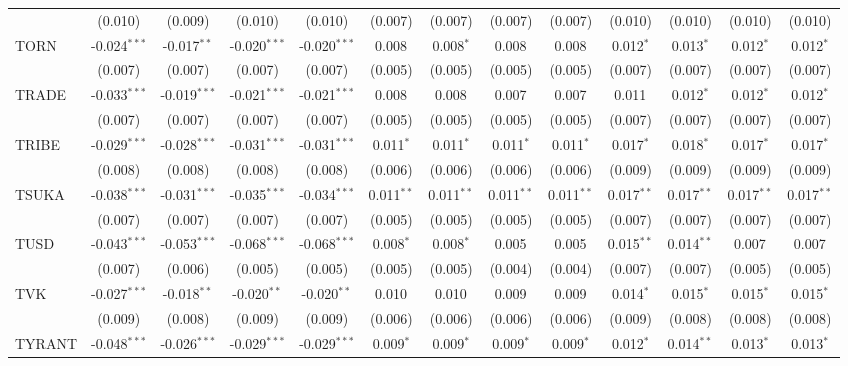 \begin{table}[!htbp]
\begin{tabular}{@{\extracolsep{5pt}}lcccccccccccc}
  & (0.010) & (0.009) & (0.010) & (0.010) & (0.007) & (0.007) & (0.007) & (0.007) & (0.010) & (0.010) & (0.010) & (0.010) \\
 TORN & -0.024$^{***}$ & -0.017$^{**}$ & -0.020$^{***}$ & -0.020$^{***}$ & 0.008$^{}$ & 0.008$^{*}$ & 0.008$^{}$ & 0.008$^{}$ & 0.012$^{*}$ & 0.013$^{*}$ & 0.012$^{*}$ & 0.012$^{*}$ \\
  & (0.007) & (0.007) & (0.007) & (0.007) & (0.005) & (0.005) & (0.005) & (0.005) & (0.007) & (0.007) & (0.007) & (0.007) \\
 TRADE & -0.033$^{***}$ & -0.019$^{***}$ & -0.021$^{***}$ & -0.021$^{***}$ & 0.008$^{}$ & 0.008$^{}$ & 0.007$^{}$ & 0.007$^{}$ & 0.011$^{}$ & 0.012$^{*}$ & 0.012$^{*}$ & 0.012$^{*}$ \\
  & (0.007) & (0.007) & (0.007) & (0.007) & (0.005) & (0.005) & (0.005) & (0.005) & (0.007) & (0.007) & (0.007) & (0.007) \\
 TRIBE & -0.029$^{***}$ & -0.028$^{***}$ & -0.031$^{***}$ & -0.031$^{***}$ & 0.011$^{*}$ & 0.011$^{*}$ & 0.011$^{*}$ & 0.011$^{*}$ & 0.017$^{*}$ & 0.018$^{*}$ & 0.017$^{*}$ & 0.017$^{*}$ \\
  & (0.008) & (0.008) & (0.008) & (0.008) & (0.006) & (0.006) & (0.006) & (0.006) & (0.009) & (0.009) & (0.009) & (0.009) \\
 TSUKA & -0.038$^{***}$ & -0.031$^{***}$ & -0.035$^{***}$ & -0.034$^{***}$ & 0.011$^{**}$ & 0.011$^{**}$ & 0.011$^{**}$ & 0.011$^{**}$ & 0.017$^{**}$ & 0.017$^{**}$ & 0.017$^{**}$ & 0.017$^{**}$ \\
  & (0.007) & (0.007) & (0.007) & (0.007) & (0.005) & (0.005) & (0.005) & (0.005) & (0.007) & (0.007) & (0.007) & (0.007) \\
 TUSD & -0.043$^{***}$ & -0.053$^{***}$ & -0.068$^{***}$ & -0.068$^{***}$ & 0.008$^{*}$ & 0.008$^{*}$ & 0.005$^{}$ & 0.005$^{}$ & 0.015$^{**}$ & 0.014$^{**}$ & 0.007$^{}$ & 0.007$^{}$ \\
  & (0.007) & (0.006) & (0.005) & (0.005) & (0.005) & (0.005) & (0.004) & (0.004) & (0.007) & (0.007) & (0.005) & (0.005) \\
 TVK & -0.027$^{***}$ & -0.018$^{**}$ & -0.020$^{**}$ & -0.020$^{**}$ & 0.010$^{}$ & 0.010$^{}$ & 0.009$^{}$ & 0.009$^{}$ & 0.014$^{*}$ & 0.015$^{*}$ & 0.015$^{*}$ & 0.015$^{*}$ \\
  & (0.009) & (0.008) & (0.009) & (0.009) & (0.006) & (0.006) & (0.006) & (0.006) & (0.009) & (0.008) & (0.008) & (0.008) \\
 TYRANT & -0.048$^{***}$ & -0.026$^{***}$ & -0.029$^{***}$ & -0.029$^{***}$ & 0.009$^{*}$ & 0.009$^{*}$ & 0.009$^{*}$ & 0.009$^{*}$ & 0.012$^{*}$ & 0.014$^{**}$ & 0.013$^{*}$ & 0.013$^{*}$ \\

\end{tabular}
\end{table}
